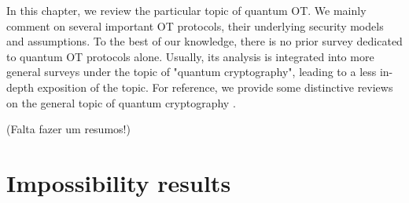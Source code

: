 In this chapter, we review the particular topic of quantum OT. We mainly comment on several important OT protocols, their underlying security models and assumptions. To the best of our knowledge, there is no prior survey dedicated to quantum OT protocols alone. Usually, its analysis is integrated into more general surveys under the topic of "quantum cryptography", leading to a less in-depth exposition of the topic. For reference, we provide some distinctive reviews on the general topic of quantum cryptography \cite{BC96, B05, M06, F10, B15, PAB+20, PR21, SH22}.

(Falta fazer um resumos!)


\section{Impossibility results}




%
%
%